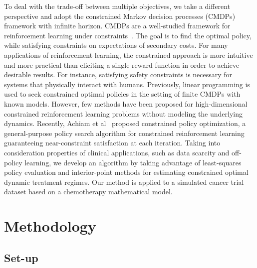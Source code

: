 To deal with the trade-off between multiple objectives, we take a different perspective and adopt the constrained Markov decision processes (CMDPs) framework with infinite horizon. CMDPs are a well-studied framework for reinforcement learning under constraints~\cite{altman99cmdp}. The goal is to find the optimal policy, while satisfying constraints on expectations of secondary costs. For many applications of reinforcement learning, the constrained approach is more intuitive and more practical than eliciting a single reward function in order to achieve desirable results. For instance, satisfying safety constraints is necessary for systems that physically interact with humans. Previously, linear programming is used to seek constrained optimal policies in the setting of finite CMDPs with known models. However, few methods have been proposed for high-dimensional constrained reinforcement learning problems without modeling the underlying dynamics. Recently, Achiam et al~\cite{Achiam2017} proposed constrained policy optimization, a general-purpose policy search algorithm for constrained reinforcement learning guaranteeing near-constraint satisfaction at each iteration. Taking into consideration properties of clinical applications, such as data scarcity and off-policy learning, we develop an algorithm by taking advantage of least-squares policy evaluation and interior-point methods for estimating constrained optimal dynamic treatment regimes. Our method is applied to a simulated cancer trial dataset based on a chemotherapy mathematical model.\\

\section{Methodology}
\subsection{Set-up}

